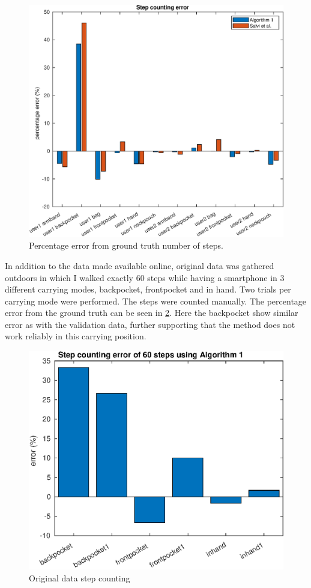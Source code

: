 	\begin{figure}[H]
		\centering
		\includegraphics[width=0.7\linewidth]{images/20201112_1401_Step_counting_error}
		\caption{Percentage error from ground truth number of steps. }
		\setlength{\belowcaptionskip}{-2cm}
		\label{fig:sd_percent_comparison}
	\end{figure}
In addition to the data made available online, original data was gathered outdoors in which I walked exactly 60 steps while having a smartphone in 3 different carrying modes, backpocket, frontpocket and in hand. Two trials per carrying mode were performed. The steps were counted manually. The percentage error from the ground truth can be seen in \cref{fig:202009291013step_counting_error_of_60_steps}. Here the backpocket show similar error as with the validation data, further supporting that the method does not work reliably in this carrying position.
\begin{figure}[H]
	\centering
	\includegraphics[width=0.58\linewidth]{images/20201112_1406_Step_counting_error_of_60_steps_using_Algorithm_1}
	\setlength{\belowcaptionskip}{-20pt}
	\caption{Original data step counting}
	\label{fig:202009291013step_counting_error_of_60_steps}
\end{figure}

